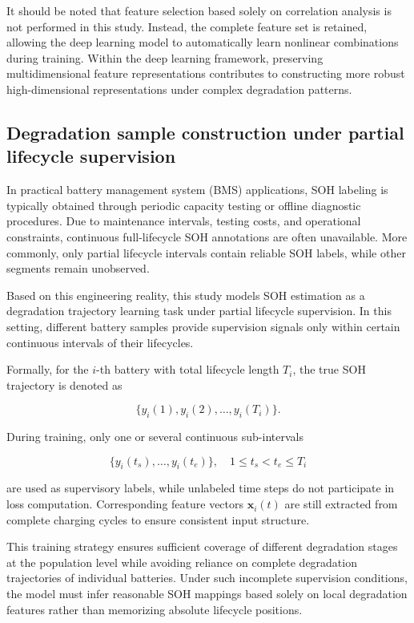 \documentclass[a4paper,fleqn]{cas-dc}
\begin{document}
It should be noted that feature selection based solely on correlation analysis is not performed in this study. Instead, the complete feature set is retained, allowing the deep learning model to automatically learn nonlinear combinations during training. Within the deep learning framework, preserving multidimensional feature representations contributes to constructing more robust high-dimensional representations under complex degradation patterns.


\subsection{Degradation sample construction under partial lifecycle supervision}
\label{subsec:partial}

In practical battery management system (BMS) applications, SOH labeling is typically obtained through periodic capacity testing or offline diagnostic procedures. Due to maintenance intervals, testing costs, and operational constraints, continuous full-lifecycle SOH annotations are often unavailable. More commonly, only partial lifecycle intervals contain reliable SOH labels, while other segments remain unobserved.

Based on this engineering reality, this study models SOH estimation as a degradation trajectory learning task under partial lifecycle supervision. In this setting, different battery samples provide supervision signals only within certain continuous intervals of their lifecycles.

Formally, for the $i$-th battery with total lifecycle length $T_i$, the true SOH trajectory is denoted as

\begin{equation}
\{y_i(1), y_i(2), \dots, y_i(T_i)\}.
\end{equation}

During training, only one or several continuous sub-intervals

\begin{equation}
\{y_i(t_s), \dots, y_i(t_e)\}, \quad 1 \le t_s < t_e \le T_i
\end{equation}

are used as supervisory labels, while unlabeled time steps do not participate in loss computation. Corresponding feature vectors $\mathbf{x}_i(t)$ are still extracted from complete charging cycles to ensure consistent input structure.

This training strategy ensures sufficient coverage of different degradation stages at the population level while avoiding reliance on complete degradation trajectories of individual batteries. Under such incomplete supervision conditions, the model must infer reasonable SOH mappings based solely on local degradation features rather than memorizing absolute lifecycle positions.
\end{document}
